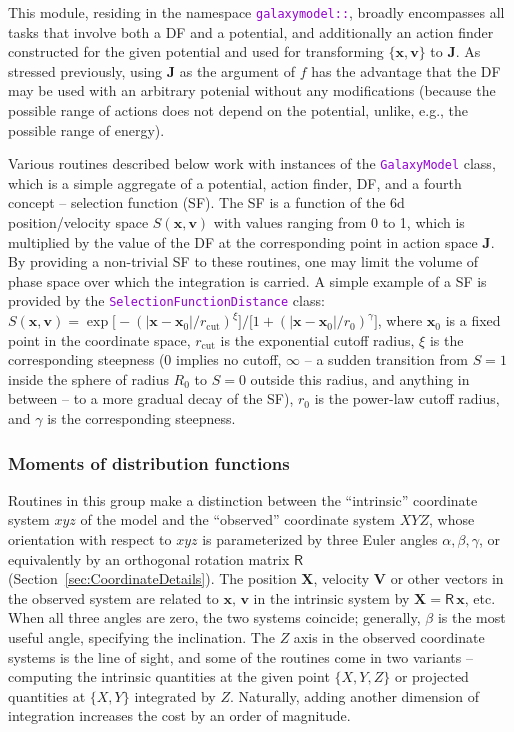 \documentclass[12pt]{article}
\newcommand{\ttt}[1]{\textcolor{darkviolet}{\texttt{#1}}}
\newcommand{\bv}{\boldsymbol{v}}
\newcommand{\bx}{\boldsymbol{x}}
\newcommand{\bX}{\boldsymbol{X}}
\newcommand{\bV}{\boldsymbol{V}}
\newcommand{\bJ}{\boldsymbol{J}}
\begin{document}
This module, residing in the namespace \ttt{galaxymodel::}, broadly encompasses all tasks that involve both a DF and a potential, and additionally an action finder constructed for the given potential and used for transforming $\{\bx,\bv\}$ to $\bJ$.
As stressed previously, using $\bJ$ as the argument of $f$ has the advantage that the DF may be used with an arbitrary potenial without any modifications (because the possible range of actions does not depend on the potential, unlike, e.g., the possible range of energy).

Various routines described below work with instances of the \ttt{GalaxyModel} class, which is a simple aggregate of a potential, action finder, DF, and a fourth concept -- selection function (SF). The SF is a function of the 6d position/velocity space $S(\bx,\bv)$ with values ranging from 0 to 1, which is multiplied by the value of the DF at the corresponding point in action space $\bJ$. By providing a non-trivial SF to these routines, one may limit the volume of phase space over which the integration is carried. A simple example of a SF is provided by the \ttt{SelectionFunctionDistance} class: 
$S(\bx, \bv) = \exp\big[ - (|\bx-\bx_0|/r_\text{cut})^\xi \big] \big/ \big[1 + (|\bx-\bx_0|/r_0)^\gamma\big]$,
where $\bx_0$ is a fixed point in the coordinate space, $r_\text{cut}$ is the exponential cutoff radius, $\xi$ is the corresponding steepness (0 implies no cutoff, $\infty$ -- a sudden transition from $S=1$ inside the sphere of radius $R_0$ to $S=0$ outside this radius, and anything in between -- to a more gradual decay of the SF), $r_0$ is the power-law cutoff radius, and $\gamma$ is the corresponding steepness.

\subsubsection{Moments of distribution functions}  \label{sec:Moments}

Routines in this group make a distinction between the ``intrinsic'' coordinate system $xyz$ of the model and the ``observed'' coordinate system $XYZ$, whose orientation with respect to $xyz$ is parameterized by three Euler angles $\alpha,\beta,\gamma$, or equivalently by an orthogonal rotation matrix $\mathsf R$ (Section~\ref{sec:CoordinateDetails}). The position $\bX$, velocity $\bV$ or other vectors in the observed system are related to $\bx,\,\bv$ in the intrinsic system by $\bX = \mathsf R\,\bx$, etc. When all three angles are zero, the two systems coincide; generally, $\beta$ is the most useful angle, specifying the inclination. The $Z$ axis in the observed coordinate systems is the line of sight, and some of the routines come in two variants -- computing the intrinsic quantities at the given point $\{X,Y,Z\}$ or projected quantities at $\{X,Y\}$ integrated by $Z$. Naturally, adding another dimension of integration increases the cost by an order of magnitude.
\end{document}
